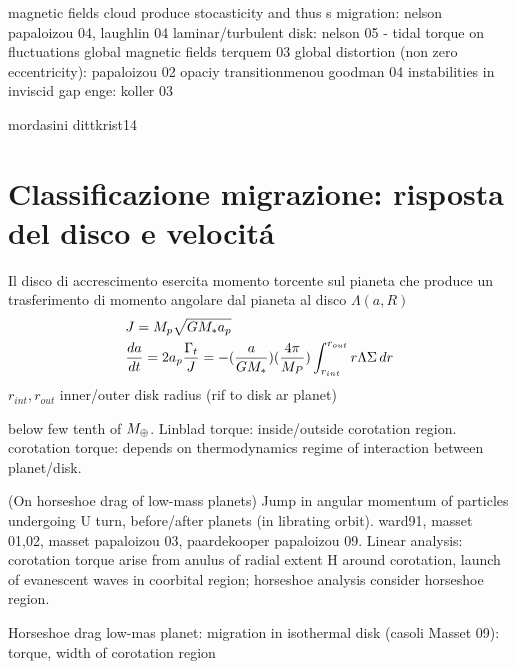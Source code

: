 \begin{workout}
\begin{workout}
magnetic fields cloud produce stocasticity and thus s migration: nelson papaloizou 04, laughlin 04
laminar/turbulent disk: nelson 05 - tidal torque on fluctuations
global magnetic fields terquem 03
global distortion (non zero eccentricity): papaloizou 02
opaciy transitionmenou goodman 04
instabilities in inviscid gap enge: koller 03
\end{workout}

\begin{workout}
mordasini dittkrist14
\end{workout}

\section{Classificazione migrazione: risposta del disco e velocit\'a}

Il disco di accrescimento esercita momento torcente sul pianeta che produce un trasferimento di momento angolare dal pianeta al disco $\Lambda(a,R)$
\begin{align*}
&J=M_p\sqrt{GM_*a_p}\\
&\TDy{t}{a}=2a_p\frac{\Gamma_t}{J}=-(\frac{a}{GM_*})(\frac{4\pi}{M_P})\int_{r_{int}}^{r_{out}}r\Lambda\Sigma\,dr
\end{align*}
$r_{int}, r_{out}$ inner/outer disk radius (rif to disk ar planet)


\begin{workout}[M14:type I]
below few tenth of $\mearth{}$.
Linblad torque: inside/outside corotation region.
corotation torque: depends on thermodynamics regime of interaction between planet/disk.
\end{workout}

\begin{workout}
(On horseshoe drag of low-mass planets)
Jump in angular momentum of particles undergoing U turn, before/after planets (in librating orbit).
ward91, masset 01,02, masset papaloizou 03, paardekooper papaloizou 09.
Linear analysis: corotation torque arise from anulus of radial extent H around corotation, launch of evanescent waves in coorbital region; horseshoe analysis consider horseshoe region.
\end{workout}

\begin{workout}
Horseshoe drag low-mas planet: migration in isothermal disk (casoli Masset 09): torque, width of corotation region
\end{workout}


\end{workout}

